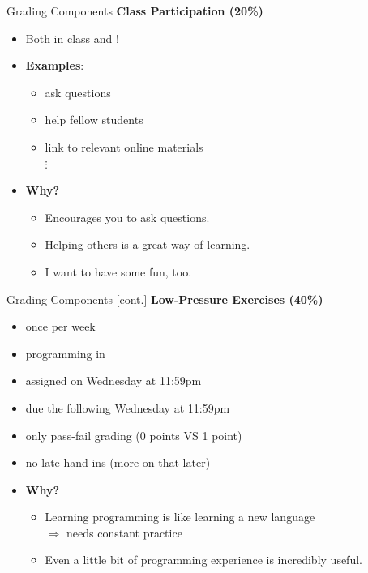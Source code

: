 \documentclass[professionalfonts, xcolor={usenames,svgnames,x11names,table}]{beamer}
\begin{document}
\begin{frame}{Grading Components}
    \textbf{Class Participation (20\%)}
        \begin{itemize}
            \item Both in class and !
            \item \textbf{Examples}:
                \begin{itemize}
                    \item ask questions
                    \item help fellow students
                    \item link to relevant online materials\\
                        $\vdots$
                \end{itemize}
            \item \textbf{Why?} 
                \begin{itemize}
                    \item Encourages you to ask questions.
                    \item Helping others is a great way of learning.
                    \item I want to have some fun, too.
                \end{itemize}
        \end{itemize}
\end{frame}

\begin{frame}{Grading Components [cont.]}
    \textbf{Low-Pressure Exercises (40\%)}
        \begin{itemize}
            \item once per week
            \item programming in 
            \item assigned on Wednesday at 11:59pm
            \item due the following Wednesday at 11:59pm
            \item only pass-fail grading (0 points VS 1 point)
            \item no late hand-ins (more on that later)
            \item \textbf{Why?}
                \begin{itemize}
                    \item Learning programming is like learning a new language\\
                            $\Rightarrow$ needs constant practice
                    \item Even a little bit of programming experience is incredibly useful.
                \end{itemize}
        \end{itemize}
\end{frame}
\end{document}
